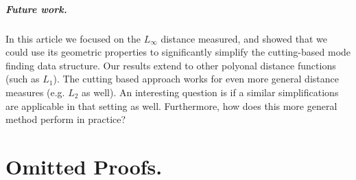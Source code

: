 \documentclass[twoside,leqno,twocolumn]{article}
\begin{document}
\subparagraph{Future work.} In this article we focused on the
$L_\infty$ distance measured, and showed that we could use its
geometric properties to significantly simplify the cutting-based mode
finding data structure. Our results extend to other polyonal distance
functions (such as $L_1$). The cutting based approach works for even
more general distance measures (e.g. $L_2$ as well). An interesting
question is if a similar simplifications are applicable in that
setting as well. Furthermore, how does this more general method
perform in practice?






\clearpage



\section{Omitted Proofs.}
\label{app:Omitted_Proofs}

\gridforCubes*
\end{document}
